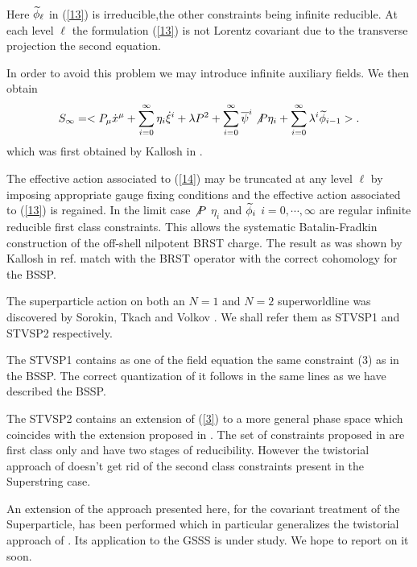 \documentclass[a4paper,10pt]{article}
\begin{document}
Here $\widetilde{\phi}_\ell$ in (\ref{13}) is irreducible,the other constraints being
infinite reducible. At each level $\ell$ the formulation (\ref{13}) is not Lorentz
covariant due to the  transverse projection the second equation.


In order to avoid this problem we may introduce infinite auxiliary fields. We
then obtain
\begin{equation}
\label{14}
S_\infty =<P_\mu \dot{x}^\mu +\sum_{i=0}^\infty \eta_i \dot{\xi}^i
+ \lambda P^2+\sum_{i=0}^{\infty}\overline{\psi}^i\not{P} \eta_i +
\sum^{\infty}_{i=0}\lambda^i\widetilde{\phi}_{i-1}>.
\end{equation}
which was first obtained by Kallosh in \cite{[10]}.

The effective action associated to (\ref{14}) may be truncated at any
level $\ell$ by imposing appropriate gauge fixing conditions and
the effective action associated to (\ref{13}) is regained. In the limit
case $\not{P}$ $\eta_i$ and $\widetilde{\phi}_i$ $i=0,\cdots ,\infty$ are
regular infinite reducible first class constraints. This  allows
the systematic Batalin-Fradkin construction of the off-shell
nilpotent BRST charge. The result as was shown by Kallosh in ref.
\cite{[10]} match with the BRST operator with the correct cohomology for
the BSSP.

The superparticle action on both an $N=1$ and $N=2$ superworldline was
discovered by Sorokin, Tkach and Volkov \cite{[13]}. We shall refer them as STVSP1 and
STVSP2 respectively.

The STVSP1 contains as one of the field equation the same constraint (3) as in
the BSSP. The correct quantization of it follows in the same lines as we have
described the BSSP.

The STVSP2 contains an extension of (\ref{3}) to a more general phase
space which coincides with the extension proposed in \cite{[14]}. The set
of constraints proposed in \cite{[14]} are first class only and have two
stages of reducibility. However the twistorial approach of \cite{[14]}
doesn't get rid of the second class constraints present in the
Superstring case.

An extension of the approach presented here, for the covariant treatment of
the Superparticle, has been performed which in particular generalizes the
twistorial approach of \cite{[14]}. Its application to the GSSS is under study. We
hope to report on it soon.
\end{document}
